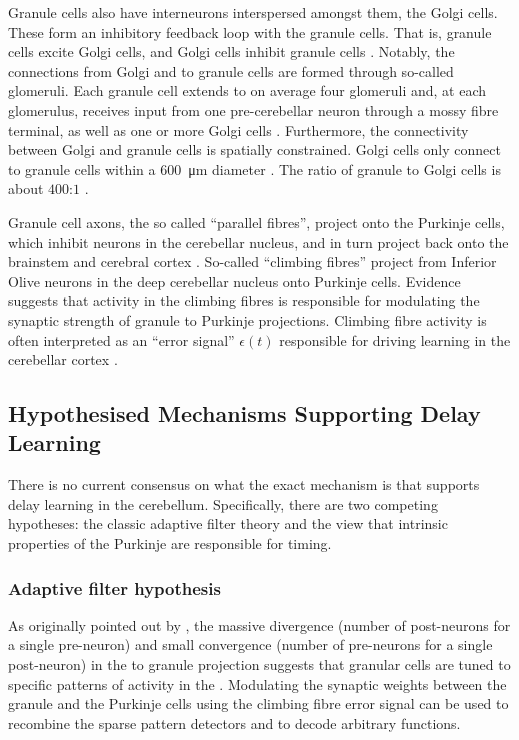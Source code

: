 Granule cells also have interneurons interspersed amongst them, the Golgi cells.
These form an inhibitory feedback loop with the granule cells.
That is, granule cells excite Golgi cells, and Golgi cells inhibit granule cells \citep{ito2010cerebellar}.
Notably, the connections from Golgi and \PCN to granule cells are formed through so-called glomeruli.
Each granule cell extends to on average four glomeruli and, at each glomerulus, receives input from one pre-cerebellar neuron through a mossy fibre terminal, as well as one or more Golgi cells \citep{palkovits1972quantitative,jakab1988quantitative,chadderton2004integration}.
Furthermore, the connectivity between Golgi and granule cells is spatially constrained.
Golgi cells only connect to granule cells within a \SI{600}{\micro\metre} diameter \citep{albus1971theory,dangelo2013cerebellar}.
The ratio of granule to Golgi cells is about $400$:$1$ \citep{korbo1993total}.

Granule cell axons, the so called \enquote{parallel fibres}, project onto the Purkinje cells, which inhibit neurons in the cerebellar nucleus, and in turn project back onto the brainstem and cerebral cortex \citep{ito2010cerebellar,llinas2010olivocerebellar}.
So-called \enquote{climbing fibres} project from Inferior Olive neurons in the deep cerebellar nucleus onto Purkinje cells. 
Evidence suggests that activity in the climbing fibres is responsible for modulating the synaptic strength of granule to Purkinje projections.
Climbing fibre activity is often interpreted as an \enquote{error signal} $\epsilon(t)$ responsible for driving learning in the cerebellar cortex \citep{ito2010cerebellar}.

\subsection{Hypothesised Mechanisms Supporting Delay Learning}

There is no current consensus on what the exact mechanism is that supports delay learning in the cerebellum.
Specifically, there are two competing hypotheses: the classic adaptive filter theory and the view that intrinsic properties of the Purkinje are responsible for timing.

\subsubsection{Adaptive filter hypothesis}
As originally pointed out by \citet{marr1969theory,albus1971theory}, the massive divergence (number of post-neurons for a single pre-neuron) and small convergence (number of pre-neurons for a single post-neuron) in the \PCN to granule projection suggests that granular cells are tuned to specific patterns of activity in the \PCN.
Modulating the synaptic weights between the granule and the Purkinje cells using the climbing fibre error signal can be used to recombine the sparse pattern detectors and to decode arbitrary functions.

